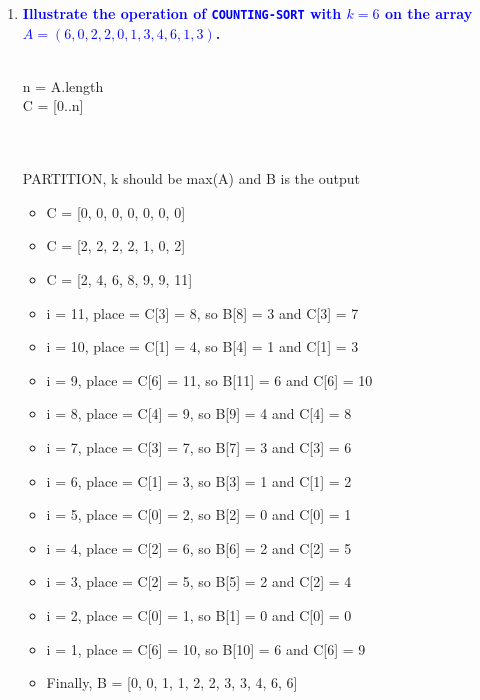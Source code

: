 \documentclass[11pt]{article}
\begin{document}
\begin{enumerate}
\item \textbf{\textcolor{blue}{Illustrate the operation of {\tt COUNTING-SORT} with $k=6$ on
the array $A=(6,0,2,2,0,1,3,4,6,1,3)$.}}
    \begin{algorithm}
        \Indm{} \\
        \Indp
            n = A.length \\
            C = [0..n] \\
             \\
             \\
        \caption{PARTITION, k should be max(A) and B is the output}
    \end{algorithm}
    \begin{itemize}
        \item C = [0, 0, 0, 0, 0, 0, 0]
        \item C = [2, 2, 2, 2, 1, 0, 2]
        \item C = [2, 4, 6, 8, 9, 9, 11]
        \item i = 11, place = C[3] = 8, so B[8] = 3 and C[3] = 7
        \item i = 10, place = C[1] = 4, so B[4] = 1 and C[1] = 3
        \item i = 9, place = C[6] = 11, so B[11] = 6 and C[6] = 10
        \item i = 8, place = C[4] = 9, so B[9] = 4 and C[4] = 8
        \item i = 7, place = C[3] = 7, so B[7] = 3 and C[3] = 6
        \item i = 6, place = C[1] = 3, so B[3] = 1 and C[1] = 2
        \item i = 5, place = C[0] = 2, so B[2] = 0 and C[0] = 1
        \item i = 4, place = C[2] = 6, so B[6] = 2 and C[2] = 5
        \item i = 3, place = C[2] = 5, so B[5] = 2 and C[2] = 4
        \item i = 2, place = C[0] = 1, so B[1] = 0 and C[0] = 0
        \item i = 1, place = C[6] = 10, so B[10] = 6 and C[6] = 9
        \item Finally, B = [0, 0, 1, 1, 2, 2, 3, 3, 4, 6, 6]
    \end{itemize}
    

\end{enumerate}
\end{document}
